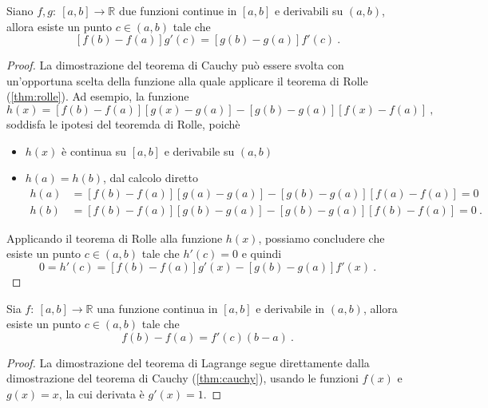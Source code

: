 \begin{theorem}\label{thm:cauchy} Siano $f, g: \ [a,b] \rightarrow \mathbb{R}$ due funzioni continue in $[a,b]$ e derivabili su $(a,b)$, allora esiste un punto $c \in (a,b)$ tale che
    \begin{equation}
        \left[ f(b) - f(a)  \right]g'(c) = \left[ g(b) - g(a)  \right]f'(c) \ .
    \end{equation}
\end{theorem}
\begin{proof}
  La dimostrazione del teorema di Cauchy può essere svolta con un'opportuna scelta della funzione alla quale applicare il teorema di Rolle (\ref{thm:rolle}). Ad esempio, la funzione
    \begin{equation}
       h(x) = [f(b) - f(a)] [ g(x) - g(a)] - [g(b)-g(a)] [f(x) - f(a)] \ ,
    \end{equation}
    soddisfa le ipotesi del teoremda di Rolle, poichè
    \begin{itemize}
        \item $h(x)$ è continua su $[a,b]$ e derivabile su $(a,b)$
        \item $h(a) = h(b)$, dal calcolo diretto
            \begin{equation}
                \begin{aligned}
                    h(a) & = [f(b) - f(a)] [ g(a) - g(a)] - [g(b)-g(a)] [f(a) - f(a)] = 0 \\ 
                    h(b) & = [f(b) - f(a)] [ g(b) - g(a)] - [g(b)-g(a)] [f(b) - f(a)] = 0  \ .
                \end{aligned}
            \end{equation}
    \end{itemize}
    Applicando il teorema di Rolle alla funzione $h(x)$, possiamo concludere che esiste un punto $c \in (a,b)$ tale che $h'(c) = 0$ e quindi
    \begin{equation}
        0 = h'(c) = [f(b) - f(a)] g'(x) - [g(b)-g(a)] f'(x) \ .
    \end{equation}
\end{proof}

\begin{theorem} Sia $f: \ [a,b] \rightarrow \mathbb{R}$ una funzione continua in $[a,b]$ e derivabile in $(a,b)$, allora esiste un punto $c \in (a,b)$ tale che
    \begin{equation}
        f(b) - f(a) = f'(c) (b-a) \ .
    \end{equation}
\end{theorem}
\begin{proof}
    La dimostrazione del teorema di Lagrange segue direttamente dalla dimostrazione del teorema di Cauchy (\ref{thm:cauchy}), usando le funzioni $f(x)$ e $g(x) = x$, la cui derivata è $g'(x) = 1$.
\end{proof}

